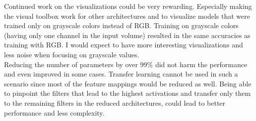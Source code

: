 Continued work on the visualizations could be very rewarding. Especially making the visual toolbox work for other architectures and to visualize models that were trained only on grayscale colors instead of RGB. Training on grayscale colors (having only one channel in the input volume) resulted in the same accuracies as training with RGB. I would expect to have more interesting visualizations and less noise when focusing on grayscale values.\\

Reducing the number of parameters by over 99\% did not harm the performance and even improved in some cases. Transfer learning cannot be used in such a scenario since most of the feature mappings would be reduced as well. Being able to pinpoint the filters that lead to the highest activations and transfer only them to the remaining filters in the reduced architectures, could lead to better performance and less complexity.\\

